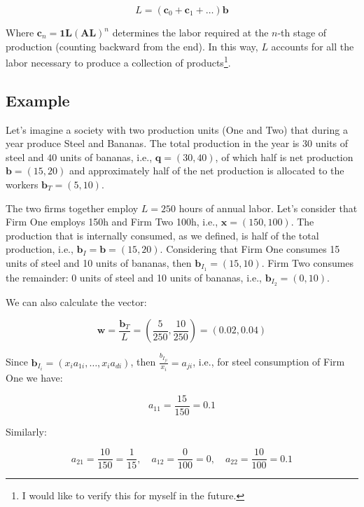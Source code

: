 \begin{equation}
L=\left(\boldsymbol{c}_{0}+\boldsymbol{c}_{1}+\dots\right)\boldsymbol{b}
\end{equation}

Where $\boldsymbol{c}_{n} = \boldsymbol{1}\boldsymbol{L}\left(\boldsymbol{A}\boldsymbol{L}\right)^{n}$ determines the labor required at the $n$-th stage of production (counting backward from the end). In this way, $L$ accounts for all the labor necessary to produce a collection of products\footnote{I would like to verify this for myself in the future.}.

\subsection{Example}


Let's imagine a society with two production units (One and Two) that during a year produce Steel and Bananas. The total production in the year is $30$ units of steel and $40$ units of bananas, i.e., $\boldsymbol{q}=\left(30,40\right)$, of which half is net production $\boldsymbol{b}=\left(15,20\right)$ and approximately half of the net production is allocated to the workers $\boldsymbol{b}_{T}=\left(5,10\right)$.

The two firms together employ $L=250$ hours of annual labor. Let's consider that Firm One employs 150h and Firm Two 100h, i.e., $\boldsymbol{x}=\left(150,100\right)$. The production that is internally consumed, as we defined, is half of the total production, i.e., $\boldsymbol{b}_{I}=\boldsymbol{b}=\left(15,20\right)$. Considering that Firm One consumes 15 units of steel and 10 units of bananas, then $\boldsymbol{b}_{I_{1}}=\left(15,10\right)$. Firm Two consumes the remainder: 0 units of steel and 10 units of bananas, i.e., $\boldsymbol{b}_{I_{2}}=\left(0,10\right)$.



We can also calculate the vector:

$$\boldsymbol{w}=\frac{\boldsymbol{b}_{T}}{L}=\left(\frac{5}{250},\frac{10}{250}\right)=\left(0.02,0.04\right)$$

Since $\boldsymbol{b}_{I_{i}}=\left(x_{i}a_{1i},\dots,x_{i}a_{di}\right)$, then $\frac{b_{I_{ji}}}{x_{i}}=a_{ji}$, i.e., for steel consumption of Firm One we have:

$$
a_{11}=\frac{15}{150}=0.1
$$

Similarly:

$$
a_{21}=\frac{10}{150}=\frac{1}{15}, \quad a_{12}=\frac{0}{100}=0, \quad a_{22}=\frac{10}{100}=0.1
$$

